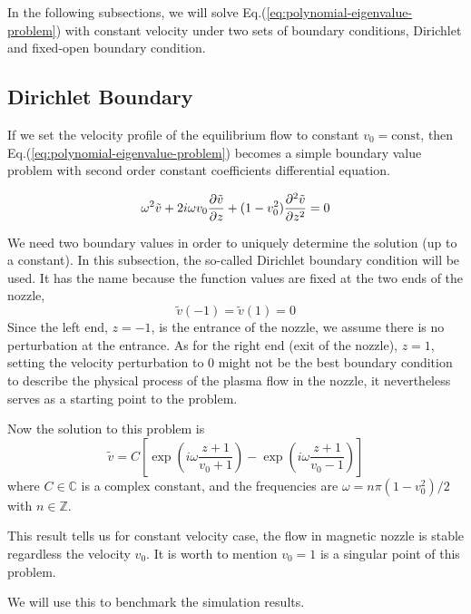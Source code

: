 In the following subsections, we will solve Eq.(\ref{eq:polynomial-eigenvalue-problem}) with constant velocity under two sets of boundary conditions, Dirichlet and fixed-open boundary condition.

\subsection{Dirichlet Boundary}
If we set the velocity profile of the equilibrium flow to constant $v_0=\text{const}$, then Eq.(\ref{eq:polynomial-eigenvalue-problem}) becomes a simple boundary value problem with second order constant coefficients differential equation.

\begin{equation} \label{eq:constant-v-problem-dirichlet}
	\omega^2\tilde{v} + 2i\omega v_0\pdv{\tilde{v}}{z} + (1-v_0^2)\pdv[2]{\tilde{v}}{z} = 0
\end{equation}

We need two boundary values in order to uniquely determine the solution (up to a constant). In this subsection, the so-called Dirichlet boundary condition will be used. It has the name because the function values are fixed at the two ends of the nozzle,
\[ \tilde{v}(-1) = \tilde{v}(1) = 0 \]
Since the left end, $z=-1$, is the entrance of the nozzle, we assume there is no perturbation at the entrance. As for the right end (exit of the nozzle), $z=1$, setting the velocity perturbation to 0 might not be the best boundary condition to describe the physical process of the plasma flow in the nozzle, it nevertheless serves as a starting point to the problem.

Now the solution to this problem is
\begin{equation} \label{eq:constant-v-solution-dirichlet}
	\tilde{v} = C\left[ \exp\left(i\omega\frac{z+1}{v_0+1}\right) - \exp\left(i\omega\frac{z+1}{v_0-1}\right) \right]
\end{equation}
where $C\in\mathbb{C}$ is a complex constant, and the frequencies are $\omega=n\pi(1-v_0^2)/2$ with $n\in\mathbb{Z}$.

This result tells us for constant velocity case, the flow in magnetic nozzle is stable regardless the velocity $v_0$. It is worth to mention $v_0=1$ is a singular point of this problem.

We will use this to benchmark the simulation results.

